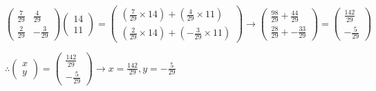 \documentclass{article}
\begin{document}
\[
	\begin{pmatrix}
		\frac{7}{29} & \frac{4}{29}\\
		\frac{2}{29} & -\frac{3}{29}
	\end{pmatrix}
	\begin{pmatrix}
		14\\
		11
	\end{pmatrix}
	=
	\begin{pmatrix}
		(\frac{7}{29}\times14)+(\frac{4}{29}\times11)\\
		(\frac{2}{29}\times14)+(-\frac{3}{29}\times11)
	\end{pmatrix}
	\rightarrow
	\begin{pmatrix}
		\frac{98}{29} + \frac{44}{29}\\
		\frac{28}{29} + -\frac{33}{29}
	\end{pmatrix}
	=
	\begin{pmatrix}
		\frac{142}{29}\\
		-\frac{5}{29}
	\end{pmatrix}
\]
\begin{center}\vspace{0.5cm}$\therefore
	\begin{pmatrix}
		x\\
		y
	\end{pmatrix}
	= 
	\begin{pmatrix}
		\frac{142}{29}\\
		-\frac{5}{29}
	\end{pmatrix}
	\rightarrow
x = \frac{142}{29}, y = -\frac{5}{29}$\end{center}
\end{document}
